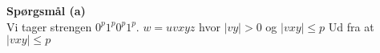 \noindent
\textbf{Spørgsmål (a)}\\
\noindent
Vi tager strengen $0^{p}1^{p}0^{p}1^{p}$. $w = uvxyz$ hvor $|vy| > 0$ og $|vxy| \le p$
Ud fra at $|vxy| \le p$




